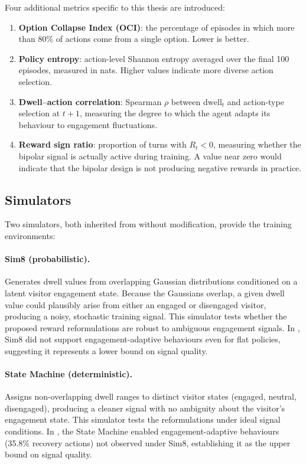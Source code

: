 \documentclass[12pt,a4paper]{article}
\begin{document}
Four additional metrics specific to this thesis are introduced:
\begin{enumerate}[nosep, start=6]
    \item \textbf{Option Collapse Index (OCI)}: the percentage of episodes in which more than 80\% of actions come from a single option. Lower is better.
    \item \textbf{Policy entropy}: action-level Shannon entropy averaged over the final 100 episodes, measured in nats. Higher values indicate more diverse action selection.
    \item \textbf{Dwell--action correlation}: Spearman $\rho$ between $\mathrm{dwell}_t$ and action-type selection at $t+1$, measuring the degree to which the agent adapts its behaviour to engagement fluctuations.
    \item \textbf{Reward sign ratio}: proportion of turns with $R_t < 0$, measuring whether the bipolar signal is actually active during training. A value near zero would indicate that the bipolar design is not producing negative rewards in practice.
\end{enumerate}

\subsection{Simulators}
\label{sec:simulators}

Two simulators, both inherited from \citet{bourdon2025} without modification, provide the training environments:

\paragraph{Sim8 (probabilistic).}
Generates dwell values from overlapping Gaussian distributions conditioned on a latent visitor engagement state. Because the Gaussians overlap, a given dwell value could plausibly arise from either an engaged or disengaged visitor, producing a noisy, stochastic training signal. This simulator tests whether the proposed reward reformulations are robust to ambiguous engagement signals. In \citet{bourdon2025}, Sim8 did not support engagement-adaptive behaviours even for flat policies, suggesting it represents a lower bound on signal quality.

\paragraph{State Machine (deterministic).}
Assigns non-overlapping dwell ranges to distinct visitor states (engaged, neutral, disengaged), producing a cleaner signal with no ambiguity about the visitor's engagement state. This simulator tests the reformulations under ideal signal conditions. In \citet{bourdon2025}, the State Machine enabled engagement-adaptive behaviours (35.8\% recovery actions) not observed under Sim8, establishing it as the upper bound on signal quality.
\end{document}

